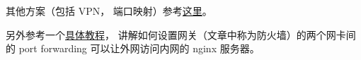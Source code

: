 其他方案（包括 VPN， 端口映射）参考\href{https://johackim.com/how-to-expose-local-server-behind-firewall}{这里}。

另外参考一个\href{https://www.digitalocean.com/community/tutorials/how-to-forward-ports-through-a-linux-gateway-with-iptables}{具体教程}， 讲解如何设置网关（文章中称为防火墙）的两个网卡间的 port forwarding 可以让外网访问内网的 nginx 服务器。 
